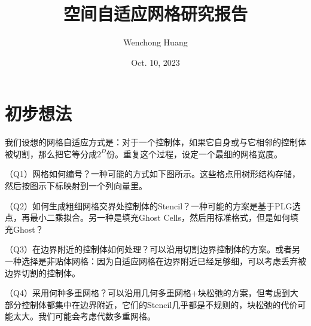 \documentclass[lang=cn,10pt,bibend=bibtex]{elegantbook}
\title{空间自适应网格研究报告}
\author{Wenchong Huang}
\date{Oct. 10, 2023}
\begin{document}
\maketitle
\frontmatter

\tableofcontents

\mainmatter

\chapter{初步想法}

我们设想的网格自适应方式是：对于一个控制体，如果它自身或与它相邻的控制体被切割，那么把它等分成$2^D$份。重复这个过程，设定一个最细的网格宽度。

（Q1）网格如何编号？一种可能的方式如下图所示。这些格点用树形结构存储，然后按图示下标映射到一个列向量里。

（Q2）如何生成粗细网格交界处控制体的Stencil？一种可能的方案是基于PLG选点，再最小二乘拟合。另一种是填充Ghost Cells，然后用标准格式，但是如何填充Ghost？

（Q3）在边界附近的控制体如何处理？可以沿用切割边界控制体的方案。或者另一种选择是非贴体网格：因为自适应网格在边界附近已经足够细，可以考虑丢弃被边界切割的控制体。

（Q4）采用何种多重网格？可以沿用几何多重网格+块松弛的方案，但考虑到大部分控制体都集中在边界附近，它们的Stencil几乎都是不规则的，块松弛的代价可能太大。我们可能会考虑代数多重网格。
\end{document}
